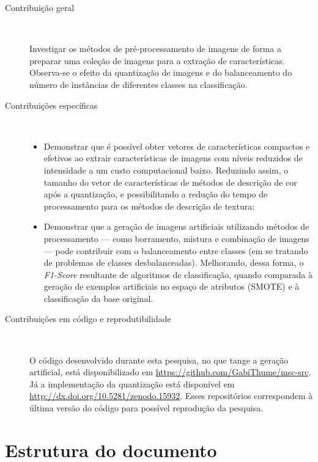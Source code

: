 \begin{description}
\item[Contribuição geral] \

Investigar os métodos de pré-processamento de imagens de forma a preparar uma coleção de imagens para a extração de características. Observa-se o efeito da quantização de imagens e do balanceamento do número de instâncias de diferentes classes na classificação.

\item[Contribuições específicas] \

  \begin{itemize}

    \item Demonstrar que é possível obter vetores de características compactos e efetivos ao extrair características de imagens com níveis reduzidos de intensidade a um custo computacional baixo. Reduzindo assim, o tamanho do vetor de características de métodos de descrição de cor após a quantização, e possibilitando a redução do tempo de processamento para os métodos de descrição de textura;

    \item Demonstrar que a geração de imagens artificiais utilizando métodos de processamento --- como borramento, mistura e combinação de imagens --- pode contribuir com o balanceamento entre classes (em se tratando de problemas de classes desbalanceadas). Melhorando, dessa forma, o \textit{F1-Score} resultante de algoritmos de classificação, quando comparada à geração de exemplos artificiais no espaço de atributos (SMOTE) e à classificação da base original.

  \end{itemize}


\item[Contribuições em código e reprodutibilidade] \

O código desenvolvido durante esta pesquisa, no que tange a geração artificial, está disponibilizado em \url{https://github.com/GabiThume/msc-src}. Já a implementação da quantização está disponível em \url{http://dx.doi.org/10.5281/zenodo.15932}. Esses repositórios correspondem à última versão do código para possível reprodução da pesquisa.

\end{description}

\section{Estrutura do documento}

